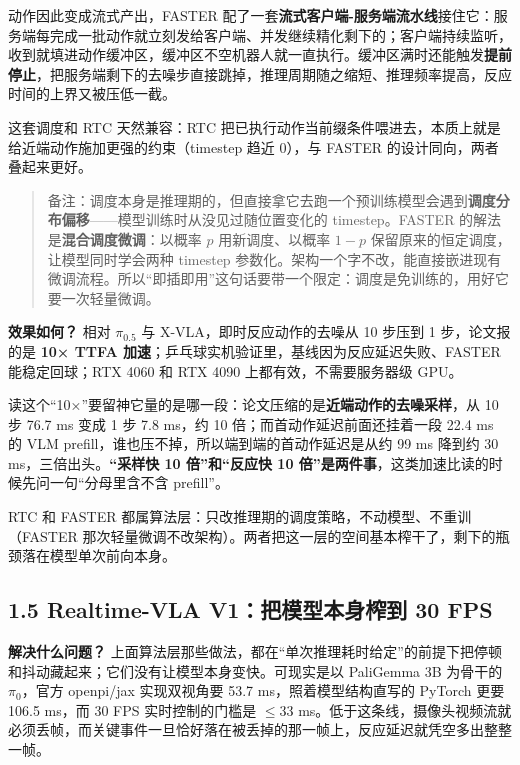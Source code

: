 \documentclass[
  chinese,
]{ctexart}
\begin{document}
动作因此变成流式产出，FASTER
配了一套\textbf{流式客户端-服务端流水线}接住它：服务端每完成一批动作就立刻发给客户端、并发继续精化剩下的；客户端持续监听，收到就填进动作缓冲区，缓冲区不空机器人就一直执行。缓冲区满时还能触发\textbf{提前停止}，把服务端剩下的去噪步直接跳掉，推理周期随之缩短、推理频率提高，反应时间的上界又被压低一截。

这套调度和 RTC 天然兼容：RTC
把已执行动作当前缀条件喂进去，本质上就是给近端动作施加更强的约束（timestep
趋近 0），与 FASTER 的设计同向，两者叠起来更好。

\begin{quote}
备注：调度本身是推理期的，但直接拿它去跑一个预训练模型会遇到\textbf{调度分布偏移}------模型训练时从没见过随位置变化的
timestep。FASTER 的解法是\textbf{混合调度微调}：以概率 \(p\)
用新调度、以概率 \(1-p\) 保留原来的恒定调度，让模型同时学会两种 timestep
参数化。架构一个字不改，能直接嵌进现有微调流程。所以``即插即用''这句话要带一个限定：调度是免训练的，用好它要一次轻量微调。
\end{quote}

\textbf{效果如何？} 相对 \(\pi_{0.5}\) 与 X-VLA，即时反应动作的去噪从 10
步压到 1 步，论文报的是 \textbf{10× TTFA
加速}；乒乓球实机验证里，基线因为反应延迟失败、FASTER 能稳定回球；RTX
4060 和 RTX 4090 上都有效，不需要服务器级 GPU。

读这个``10×''要留神它量的是哪一段：论文压缩的是\textbf{近端动作的去噪采样}，从
10 步 76.7 ms 变成 1 步 7.8 ms，约 10 倍；而首动作延迟前面还挂着一段
22.4 ms 的 VLM prefill，谁也压不掉，所以端到端的首动作延迟是从约 99 ms
降到约 30 ms，三倍出头。\textbf{``采样快 10 倍''和``反应快 10
倍''是两件事}，这类加速比读的时候先问一句``分母里含不含 prefill''。

RTC 和 FASTER 都属算法层：只改推理期的调度策略，不动模型、不重训（FASTER
那次轻量微调不改架构）。两者把这一层的空间基本榨干了，剩下的瓶颈落在模型单次前向本身。

\subsection{1.5 Realtime-VLA V1：把模型本身榨到 30
FPS}\label{realtime-vla-v1ux628aux6a21ux578bux672cux8eabux69a8ux5230-30-fps}

\textbf{解决什么问题？}
上面算法层那些做法，都在``单次推理耗时给定''的前提下把停顿和抖动藏起来；它们没有让模型本身变快。可现实是以
PaliGemma 3B 为骨干的 \(\pi_0\)，官方 openpi/jax 实现双视角要 53.7
ms，照着模型结构直写的 PyTorch 更要 106.5 ms，而 30 FPS 实时控制的门槛是
\(\leq 33\)
ms。低于这条线，摄像头视频流就必须丢帧，而关键事件一旦恰好落在被丢掉的那一帧上，反应延迟就凭空多出整整一帧。
\end{document}

